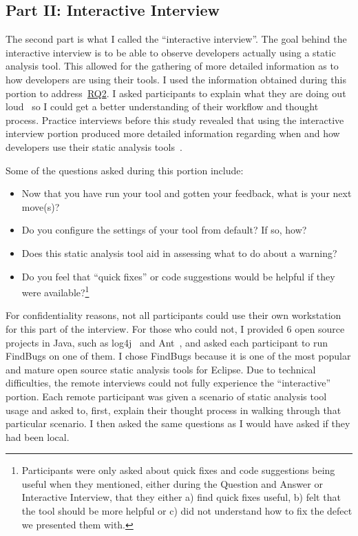 \subsection{Part II: Interactive Interview}
\label{subsec:part2}
The second part is what I called the ``interactive interview''. The goal behind the
interactive interview is to be able to observe developers actually using a
static analysis tool. This allowed for the gathering of more detailed information as to how
developers are using their tools. I used the information obtained during
this portion to address~\hyperlink{RQ2}{RQ2}. I asked participants to
explain what they are doing out loud~\cite{Lewis:1982:ThinkAloudProtocol} so I
could get a better understanding of their workflow and thought process. Practice
interviews before this study revealed that using the interactive interview
portion produced more detailed information regarding when and how developers use
their static analysis tools~\cite{Johnson:2012:PreFFSAT}.

Some of the questions asked during this portion include:
\begin{itemize}
\item Now that you have run your tool and gotten your feedback, what is your next move(s)?
\item Do you configure the settings of your tool from default? If so, how?
\item Does this static analysis tool aid in assessing what to do about a warning?
\item Do you feel that ``quick fixes'' or code suggestions would be helpful if
they were available?\footnote{Participants were only asked about quick fixes and
code suggestions being useful when they mentioned, either during the Question
and Answer or Interactive Interview, that they either a) find quick fixes
useful, b) felt that the tool should be more helpful or c) did not understand
how to fix the defect we presented them with. }
\end{itemize}

For confidentiality reasons, not all participants could use their own
workstation for this part of the interview. For those who could not, I provided
6 open source projects in Java, such as log4j~\cite{log4j} and Ant~\cite{ANT},
and asked each participant to run FindBugs on one of them.  I chose FindBugs
because it is one of the most popular and mature open source static analysis tools for
Eclipse. Due to technical difficulties, the remote interviews could not fully experience the ``interactive'' portion. 
Each remote participant was given a scenario of static analysis tool usage and asked to, first, explain their thought process in
walking through that particular scenario. I then asked the same questions as I would have asked if they had been local.


